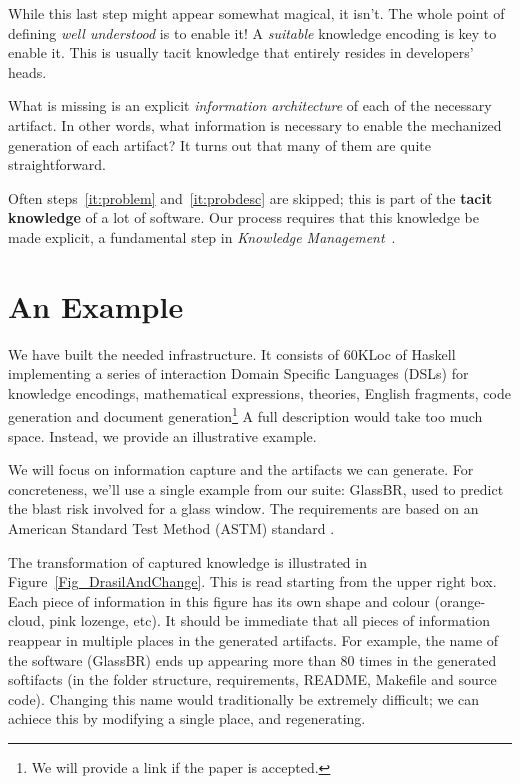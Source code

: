 \documentclass[sigconf,review,anonymous=false]{acmart}
\begin{document}
While this last step might appear somewhat magical, it isn't. The whole point of
defining \emph{well understood} is to enable it! A \emph{suitable}
knowledge encoding is key to enable it. This is usually tacit knowledge that
entirely resides in developers' heads.

What is missing is an explicit \emph{information architecture} of each of
the necessary artifact. In other words, what information is necessary to
enable the mechanized generation of each artifact? It turns out that many
of them are quite straightforward.

Often steps~\ref{it:problem} and~\ref{it:probdesc} are skipped; this is
part of the \textbf{tacit knowledge} of a lot
of software.  Our process requires that this knowledge be made explicit,
a fundamental step in \emph{Knowledge Management}~\cite{Dalkir2011}.


\section{An Example}\label{ch:example}

We have built the needed infrastructure. It consists of 60KLoc of Haskell
implementing a series of interaction Domain Specific Languages (DSLs) for
knowledge encodings, mathematical expressions, theories, English fragments,
code generation and document generation\footnote{We will provide a link
if the paper is accepted.} A full description would take too much space.
Instead, we provide an illustrative example.

We will focus on information capture and the artifacts we can generate.
For concreteness, we'll use a single example from our suite: GlassBR, used
to predict the blast risk involved for a glass window.  The requirements
are based on an American Standard Test Method (ASTM) standard
\cite{BeasonEtAl1998}.

The transformation of captured knowledge is illustrated in
Figure~\ref{Fig_DrasilAndChange}. This is read starting from the upper
right box. Each piece of information in this figure has its own
shape and colour (orange-cloud, pink lozenge, etc). It should be immediate
that all pieces of information reappear in multiple places in the generated
artifacts. For example, the name of the software (GlassBR) ends up
appearing more than 80 times in the generated softifacts (in the folder
structure, requirements, README, Makefile and source code). Changing this
name would traditionally be extremely difficult; we can achiece this by
modifying a single place, and regenerating.
\end{document}
